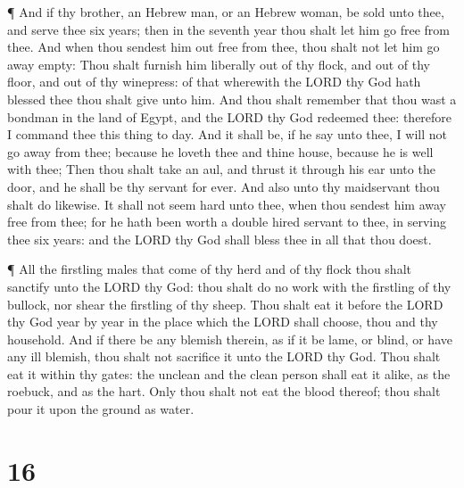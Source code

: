  ¶ And if thy brother, an Hebrew man, or an Hebrew woman,
be sold unto thee, and serve thee six years; then in the seventh year
thou shalt let him go free from thee.  And when thou
sendest him out free from thee, thou shalt not let him go away empty:
 Thou shalt furnish him liberally out of thy flock, and out
of thy floor, and out of thy winepress: of that wherewith the LORD thy
God hath blessed thee thou shalt give unto him.  And thou
shalt remember that thou wast a bondman in the land of Egypt, and the
LORD thy God redeemed thee: therefore I command thee this thing to day.
 And it shall be, if he say unto thee, I will not go away
from thee; because he loveth thee and thine house, because he is well
with thee;  Then thou shalt take an aul, and thrust it
through his ear unto the door, and he shall be thy servant for ever. And
also unto thy maidservant thou shalt do likewise.  It shall
not seem hard unto thee, when thou sendest him away free from thee; for
he hath been worth a double hired servant to thee, in serving thee six
years: and the LORD thy God shall bless thee in all that thou doest.

 ¶ All the firstling males that come of thy herd and of thy
flock thou shalt sanctify unto the LORD thy God: thou shalt do no work
with the firstling of thy bullock, nor shear the firstling of thy sheep.
 Thou shalt eat it before the LORD thy God year by year in
the place which the LORD shall choose, thou and thy household.
 And if there be any blemish therein, as if it be lame, or
blind, or have any ill blemish, thou shalt not sacrifice it unto the
LORD thy God.  Thou shalt eat it within thy gates: the
unclean and the clean person shall eat it alike, as the roebuck, and as
the hart.  Only thou shalt not eat the blood thereof; thou
shalt pour it upon the ground as water.

\hypertarget{section-15}{%
\section{16}\label{section-15}}

